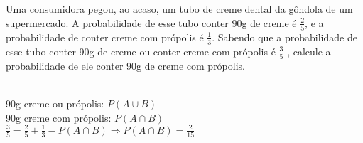 \begin{ex}
Uma consumidora pegou, ao acaso, um tubo de creme dental da gôndola de um supermercado. A probabilidade de esse tubo conter 90g de creme é $\frac{2}{5}$, e a probabilidade de conter creme com própolis é $\frac{1}{3}$. Sabendo que a probabilidade de esse tubo conter 90g de creme ou conter creme com própolis é $\frac{3}{5}$ , calcule a probabilidade de ele conter 90g de creme com própolis.
  \begin{sol}
     \phantom{A} \\
     90g creme ou própolis: \hspace{0,3cm}$P(A \cup B)$ \\
     90g creme com própolis:  \hspace{0,3cm}$P(A \cap B)$ \\
     $\frac{3}{5}=\frac{2}{5}+\frac{1}{3}-P(A \cap B) \Longrightarrow P(A \cap B)=\frac{2}{15}$
  \end{sol}
\end{ex}